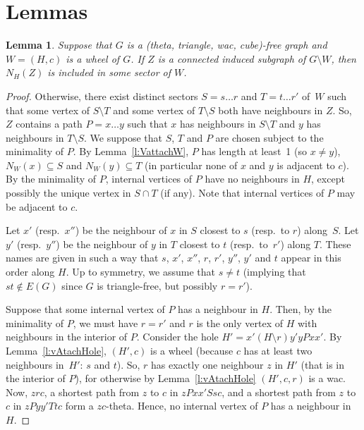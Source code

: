 \documentclass[11pt]{article}
\newtheorem{lemma}[theo]{Lemma}
\newcommand{\sm}{\setminus}
\begin{document}
\section{Lemmas}
\label{sec:lem}


\begin{lemma}
  \label{l:CattachW}
  Suppose that $G$ is a (theta, triangle, wac, cube)-free graph and $W = (H, c)$ is a wheel of $G$.  
  If $Z$ is a connected induced subgraph of $G\sm W$, then $N_H(Z)$ is included in some sector of $W$.
  \end{lemma}


\begin{proof}
  Otherwise, there exist distinct sectors $S = s\dots r$ and $T = t \dots r'$ of~$W$ such that some vertex of $S\sm T$ and some vertex of $T \sm S$ both have neighbours in $Z$.  
  So, $Z$ contains a path $P = x\dots y$ such that $x$ has neighbours in $S\sm T$ and $y$ has neighbours in $T \sm S$. 
  We suppose that $S$, $T$ and $P$ are chosen subject to the minimality of $P$.  
  By Lemma~\ref{l:VattachW}, $P$ has length at least~1 (so $x\neq y$), $N_W(x) \subseteq S$ and $N_W(y) \subseteq T$ (in particular none of $x$ and $y$ is adjacent to $c$).  
  By the minimality of $P$, internal vertices of $P$ have no neighbours in $H$, except possibly the unique vertex in $S \cap T$ (if any).  
  Note that internal vertices of $P$ may be adjacent to $c$. 


  Let $x'$ (resp.\ $x''$) be the neighbour of $x$ in $S$ closest to  $s$ (resp.\ to $r$) along~$S$.  
  Let $y'$ (resp.\ $y''$) be the neighbour of $y$ in $T$ closest to $t$ (resp.\ to~$r'$) along $T$.
  These names are given in such a way that $s$, $x'$, $x''$, $r$, $r'$, $y''$, $y'$ and $t$ appear in this order along $H$.  
  Up to symmetry, we assume that $s\neq t$ (implying that $st\notin E(G)$ since $G$ is triangle-free, but possibly $r=r'$).

  Suppose that some internal vertex of $P$ has a neighbour in $H$.
  Then, by the minimality of $P$, we must have $r=r'$ and $r$ is the only vertex of $H$ with neighbours in the interior of $P$. 
  Consider the hole $H' = x' (H \sm r) y' y P x x'$.  
  By Lemma~\ref{l:vAtachHole}, $(H', c)$ is a wheel (because $c$ has at least two neighbours in~$H'$: $s$ and $t$).  
  So, $r$ has exactly one neighbour $z$ in $H'$ (that is in the interior of $P$), for otherwise by Lemma~\ref{l:vAtachHole} $(H', c, r)$ is a wac.    
  Now, $zrc$, a shortest path from $z$ to $c$ in $z P x x' S s c$, and a shortest path from $z$ to $c$ in $z P y y' T t c$ form a $zc$-theta. 
  Hence, no internal vertex of $P$ has a neighbour in $H$. 
  

\end{proof}
\end{document}
